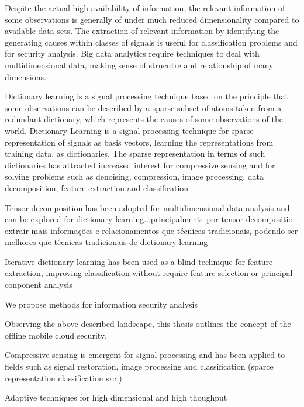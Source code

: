 Despite the actual high availability of information, the relevant information of some observations is generally of under much reduced dimensionality compared to available data sets. The extraction of relevant information by identifying the generating causes within classes of signals is useful for classification problems and for security analysis. Big data analytics require techniques to deal with multidimensional data, making sense of strucutre and relationship of many dimensions. 

Dictionary learning is a signal processing technique based on the principle that some observations can be described by a sparse subset of atoms taken from a redundant dictionary, which represents the causes of some observations of the world. Dictionary Learning is a signal processing technique for sparse representation of signals as basis vectors, learning the representations from training data, as dictionaries. The sparse representation in terms of such dictionaries has attracted increased interest for compressive sensing and for solving problems such as denoising, compression, image processing, data decomposition, feature extraction and classification \cite{tosic2011dictionary, zhang2010discriminative, zhu2016coupled,ravishankar2011mr}.

Tensor decomposition has been adopted for multidimensional data analysis and can be explored for dictionary learning...principalmente por tensor decompositio extrair mais informações e relacionamentos que técnicas tradicionais, podendo ser melhores que técnicas tradicionais de dictionary learning

Iterative dictionary learning has been used as a blind technique for feature extraction, improving classification without require feature selection or principal conponent analysis

We propose methods for information security analysis 

Observing the above described landscape, this thesis outlines the concept of the offline mobile cloud security.

Compressive sensing is emergent for signal processing and has been applied to fields such as signal restoration, image processing and classification (sparce representation classification src )

Adaptive techniques for high dimensional and high thoughput


